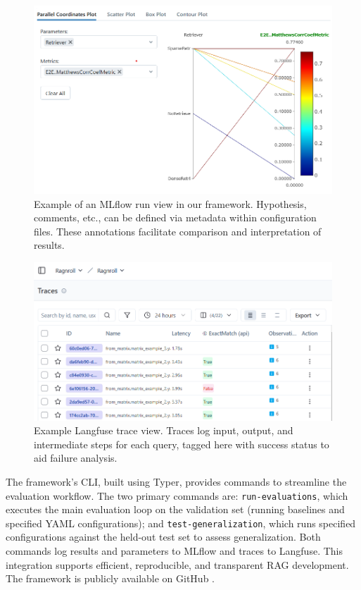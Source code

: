 \begin{figure}
  \centering
  \includegraphics[width=\textwidth]{images/MLFlow-Vis.png}
  \caption{Example of an MLflow run view in our framework. Hypothesis, comments, etc., can be defined via metadata within configuration files. These annotations facilitate comparison and interpretation of results.}
  \label{fig:mlflow}
\end{figure}

\begin{figure}
\centering
\includegraphics[width=\textwidth]{images/langfuse.png}
\caption{Example Langfuse trace view. Traces log input, output, and intermediate steps for each query, tagged here with success status to aid failure analysis.}
\label{fig:langfuse}
\end{figure}

The framework's CLI, built using Typer, provides commands to streamline the evaluation workflow. The two primary commands are: \texttt{run-evaluations}, which executes the main evaluation loop on the validation set (running baselines and specified YAML configurations); and \texttt{test-generalization}, which runs specified configurations against the held-out test set to assess generalization. Both commands log results and parameters to MLflow and traces to Langfuse. This integration supports efficient, reproducible, and transparent RAG development. The framework is publicly available on GitHub \cite{albrecht-2025}.

